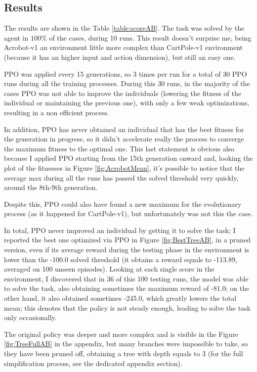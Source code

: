 \subsection{Results}
\label{subsec:423}
The results are shown in the Table \ref{table:scoreAB}. The task was solved by the agent in $100\%$ of the cases, during 10 runs. This result doesn't surprise me, being Acrobot-v1 an environment little more complex than CartPole-v1 environment (because it has an higher input and action dimension), but still an easy one.

PPO was applied every 15 generations, so 3 times per run for a total of 30 PPO runs during all the training processes. During this 30 runs, in the majority of the cases PPO was not able to improve the individuals (lowering the fitness of the individual or maintaining the previous one), with only a few weak optimizations, resulting in a non efficient process.

In addition, PPO has never obtained an individual that has the best fitness for the generation in progress, so it didn't accelerate really the process to converge the maximum fitness to the optimal one. This last statement is obvious also because I applied PPO starting from the 15th generation onward and, looking the plot of the fitnesses in Figure \ref{fig:AcrobotMean}, it's possible to notice that the average max during all the runs has passed the solved threshold very quickly, around the 8th-9th generation.

Despite this, PPO could also have found a new maximum for the evolutionary process (as it happened for CartPole-v1), but unfortunately was not this the case.

In total, PPO never improved an individual by getting it to solve the task; I reported the best one optimized via PPO in Figure \ref{fig:BestTreeAB}, in a pruned version, even if its average reward during the testing phase in the environment is lower than the -100.0 solved threshold (it obtains a reward equals to -113.89, averaged on 100 unseen episodes). Looking at each single score in the environment, I discovered that in 36 of this 100 testing runs, the model was able to solve the task, also obtaining sometimes the maximum reward of -81.0; on the other hand, it also obtained sometimes -245.0, which greatly lowers the total mean; this denotes that the policy is not steady enough, leading to solve the task only occasionally.

The original policy was deeper and more complex and is visible in the Figure \ref{fig:TreeFullAB} in the appendix, but many branches were impossible to take, so they have been pruned off, obtaining a tree with depth equals to 3 (for the full simplification process, see the dedicated appendix section).

